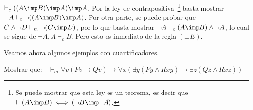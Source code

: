 \documentclass[11pt,letterpaper]{article}
\begin{document}
\item $\vdash_c ((A\imp B)\imp A)\imp A$. Por la ley de 
contrapositiva~\footnote{Se puede mostrar que esta ley es un teorema, es decir 
que $\vdash (A\imp B) \iff (\lnot B\imp \lnot A)$.} basta 
mostrar  $\neg A\vdash_c \neg((A\imp B)\imp A)$. Por otra parte, se puede
probar que $C\land\neg D\vdash_m \neg (C\imp D)$, por lo que basta mostrar 
$\neg A\vdash_c (A\imp B)\land\neg A$, lo cual se sigue de $\neg A, A\vdash_c 
B$. Pero esto es inmediato de la regla $(\bot E)$.

\ei


Veamos ahora algunos ejemplos con cuantificadores.

\bi
\item Mostrar que:
$\;\;
\vdash_m \forall v (Pv \rightarrow Qv) 
\rightarrow \forall x (\exists y (P y \wedge Rxy) \rightarrow \exists z (Qz 
\wedge Rxz))
$
\end{document}
